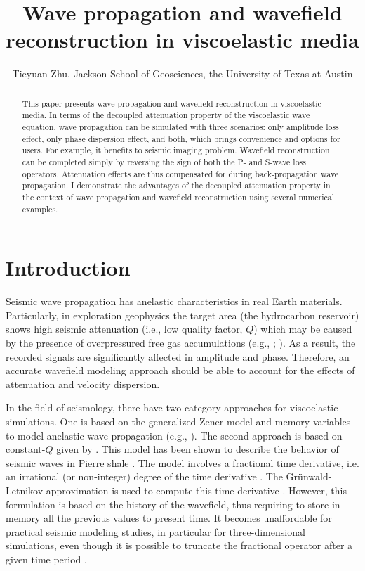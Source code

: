 
\title{Wave propagation and wavefield reconstruction in viscoelastic media}

\author{Tieyuan Zhu, Jackson School of Geosciences, the University of Texas at Austin}
\maketitle


\begin{abstract}
This paper presents wave propagation and wavefield reconstruction in viscoelastic media. In terms of the decoupled attenuation property of the viscoelastic wave equation, wave propagation can be simulated with three scenarios: only amplitude loss effect, only phase dispersion effect, and both, which brings convenience and options for users. For example, it benefits to seismic imaging problem. Wavefield reconstruction can be completed simply by reversing the sign of both the P- and S-wave loss operators. Attenuation effects are thus compensated for during back-propagation wave propagation. I demonstrate the advantages of the decoupled attenuation property in the context of wave propagation and wavefield reconstruction using several numerical examples.
\end{abstract}

\section{Introduction}

Seismic wave propagation has anelastic characteristics in real Earth materials. Particularly, in exploration geophysics the target area (the hydrocarbon reservoir) shows high seismic attenuation (i.e., low quality factor, $Q$) which may be caused by the presence of overpressured free gas accumulations (e.g., \citealt{carcione2003}; \citealt{dvorkin2006}). As a result, the recorded signals are significantly affected in amplitude and phase. Therefore, an accurate wavefield modeling approach should be able to account for the effects of attenuation and velocity dispersion. 

In the field of seismology, there have two category approaches for viscoelastic simulations. One is based on the generalized Zener model and memory variables to model anelastic wave propagation (e.g., \citealt{carcione1988}). The second approach is based on constant-$Q$ given by \citet[]{kja79}. This model has been shown to describe the behavior of seismic waves in Pierre shale \cite[]{McDonal1958}. The model involves a fractional time derivative, i.e. an irrational (or non-integer) degree of the time derivative \cite[]{Caputo1971}. The Grünwald-Letnikov approximation \cite[]{Podlubny1999} is used to compute this time derivative \cite[]{carcione2002,carcione2009}. However, this formulation is based on the history of the wavefield, thus requiring to store in memory all the previous values to present time. It becomes unaffordable for practical seismic modeling studies, in particular for three-dimensional simulations, even though it is possible to truncate the fractional operator after a given time period \cite[]{carcione2002}.

